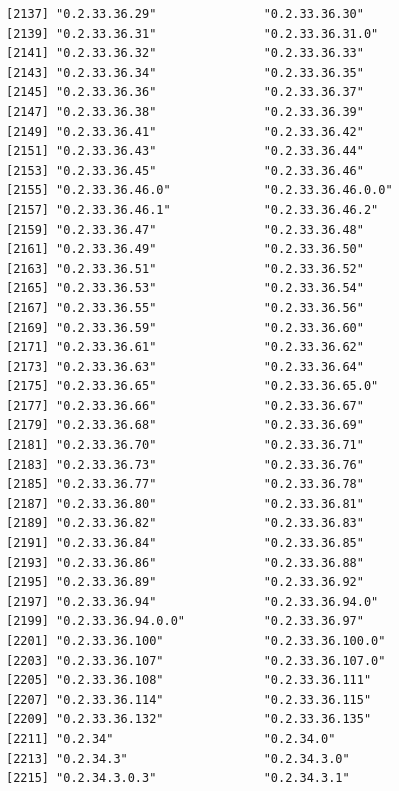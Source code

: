 \documentclass[
  letterpaper,
  DIV=11,
  numbers=noendperiod]{scrreprt}
\begin{document}
\begin{verbatim}
[2137] "0.2.33.36.29"               "0.2.33.36.30"              
[2139] "0.2.33.36.31"               "0.2.33.36.31.0"            
[2141] "0.2.33.36.32"               "0.2.33.36.33"              
[2143] "0.2.33.36.34"               "0.2.33.36.35"              
[2145] "0.2.33.36.36"               "0.2.33.36.37"              
[2147] "0.2.33.36.38"               "0.2.33.36.39"              
[2149] "0.2.33.36.41"               "0.2.33.36.42"              
[2151] "0.2.33.36.43"               "0.2.33.36.44"              
[2153] "0.2.33.36.45"               "0.2.33.36.46"              
[2155] "0.2.33.36.46.0"             "0.2.33.36.46.0.0"          
[2157] "0.2.33.36.46.1"             "0.2.33.36.46.2"            
[2159] "0.2.33.36.47"               "0.2.33.36.48"              
[2161] "0.2.33.36.49"               "0.2.33.36.50"              
[2163] "0.2.33.36.51"               "0.2.33.36.52"              
[2165] "0.2.33.36.53"               "0.2.33.36.54"              
[2167] "0.2.33.36.55"               "0.2.33.36.56"              
[2169] "0.2.33.36.59"               "0.2.33.36.60"              
[2171] "0.2.33.36.61"               "0.2.33.36.62"              
[2173] "0.2.33.36.63"               "0.2.33.36.64"              
[2175] "0.2.33.36.65"               "0.2.33.36.65.0"            
[2177] "0.2.33.36.66"               "0.2.33.36.67"              
[2179] "0.2.33.36.68"               "0.2.33.36.69"              
[2181] "0.2.33.36.70"               "0.2.33.36.71"              
[2183] "0.2.33.36.73"               "0.2.33.36.76"              
[2185] "0.2.33.36.77"               "0.2.33.36.78"              
[2187] "0.2.33.36.80"               "0.2.33.36.81"              
[2189] "0.2.33.36.82"               "0.2.33.36.83"              
[2191] "0.2.33.36.84"               "0.2.33.36.85"              
[2193] "0.2.33.36.86"               "0.2.33.36.88"              
[2195] "0.2.33.36.89"               "0.2.33.36.92"              
[2197] "0.2.33.36.94"               "0.2.33.36.94.0"            
[2199] "0.2.33.36.94.0.0"           "0.2.33.36.97"              
[2201] "0.2.33.36.100"              "0.2.33.36.100.0"           
[2203] "0.2.33.36.107"              "0.2.33.36.107.0"           
[2205] "0.2.33.36.108"              "0.2.33.36.111"             
[2207] "0.2.33.36.114"              "0.2.33.36.115"             
[2209] "0.2.33.36.132"              "0.2.33.36.135"             
[2211] "0.2.34"                     "0.2.34.0"                  
[2213] "0.2.34.3"                   "0.2.34.3.0"                
[2215] "0.2.34.3.0.3"               "0.2.34.3.1"                

\end{verbatim}
\end{document}
